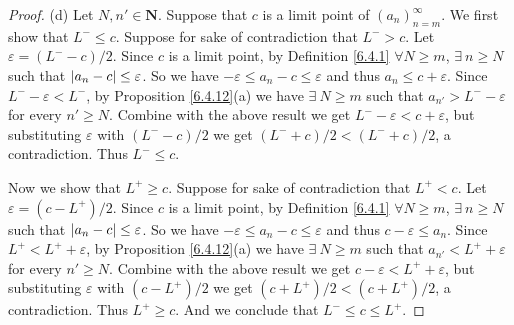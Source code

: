 \begin{proof}{(d)}
    Let \(N, n' \in \mathbf{N}\).
    Suppose that \(c\) is a limit point of \((a_n)_{n = m}^\infty\).
    We first show that \(L^- \leq c\).
    Suppose for sake of contradiction that \(L^- > c\).
    Let \(\varepsilon = (L^- - c) / 2\).
    Since \(c\) is a limit point, by Definition \ref{6.4.1} \(\forall N \geq m\), \(\exists\ n \geq N\) such that \(\abs*{a_n - c} \leq \varepsilon\).
    So we have \(-\varepsilon \leq a_n - c \leq \varepsilon\) and thus \(a_n \leq c + \varepsilon\).
    Since \(L^- - \varepsilon < L^-\), by Proposition \ref{6.4.12}(a) we have \(\exists\ N \geq m\) such that \(a_{n'} > L^- - \varepsilon\) for every \(n' \geq N\).
    Combine with the above result we get \(L^- - \varepsilon < c + \varepsilon\), but substituting \(\varepsilon\) with \((L^- - c) / 2\) we get \((L^- + c) / 2 < (L^- + c) / 2\), a contradiction.
    Thus \(L^- \leq c\).

    Now we show that \(L^+ \geq c\).
    Suppose for sake of contradiction that \(L^+ < c\).
    Let \(\varepsilon = (c - L^+) / 2\).
    Since \(c\) is a limit point, by Definition \ref{6.4.1} \(\forall N \geq m\), \(\exists\ n \geq N\) such that \(\abs*{a_n - c} \leq \varepsilon\).
    So we have \(-\varepsilon \leq a_n - c \leq \varepsilon\) and thus \(c - \varepsilon \leq a_n\).
    Since \(L^+ < L^+ + \varepsilon\), by Proposition \ref{6.4.12}(a) we have \(\exists\ N \geq m\) such that \(a_{n'} < L^+ + \varepsilon\) for every \(n' \geq N\).
    Combine with the above result we get \(c - \varepsilon < L^+ + \varepsilon\), but substituting \(\varepsilon\) with \((c - L^+) / 2\) we get \((c + L^+) / 2 < (c + L^+) / 2\), a contradiction.
    Thus \(L^+ \geq c\).
    And we conclude that \(L^- \leq c \leq L^+\).
\end{proof}

